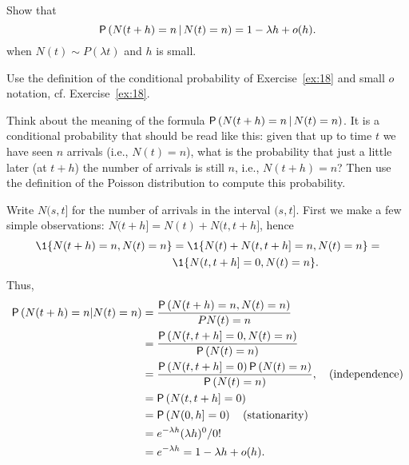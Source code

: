 \begin{exercise}{\faFlask}\label{ex:35}
  Show that 
  \begin{equation*}
\P{N(t+h) = n \given N(t) = n} = 1-\lambda h + o(h).
  \end{equation*}
when $N(t) \sim P(\lambda t)$  and $h$ is small. 
    \begin{hint}
Use  the definition of the conditional probability of Exercise~\ref{ex:18} and small $o$ notation, cf. Exercise~\ref{ex:18}. 

Think about the meaning of the formula $\P{N(t+h) = n \given N(t) = n}$.
It is a conditional probability that should be read like this: given that up to time $t$ we have seen $n$ arrivals (i.e., $N(t)=n$), what is the probability that just a little later (at $t+h$) the number of arrivals is still $n$, i.e., $N(t+h)=n$?
Then use the definition of the Poisson distribution to compute this probability.
    \end{hint}
\begin{solution}
Write $N(s, t]$ for the number of arrivals in the interval $(s,t]$. First we make a few simple observations: $N(t+h]= N(t) + N(t, t+h]$, hence
\begin{equation*}
  \begin{split}
  \1{N(t+h)=n, N(t)=n}
&=  \1{N(t) + N(t, t+h] = n, N(t)=n} = \\
&\1{N(t, t+h] = 0, N(t)=n}.
  \end{split}
\end{equation*}
Thus, 
    \begin{align*}
  \P{N(t+h) = n | N(t) = n} 
&=  \frac{\P{N(t+h) = n, N(t) = n}}{P{N(t)=n}} \\
&=  \frac{\P{N(t, t+h] = 0,  N(t) = n}}{\P{N(t)=n}} \\
&=  \frac{\P{N(t, t+h] = 0} \P{N(t) = n}}{\P{N(t)=n}}, \quad \text{(independence)}\\
&= \P{N(t, t+h] = 0} \\
&= \P{N(0, h] = 0} \quad\text{(stationarity)} \\
&= e^{-\lambda h} (\lambda h)^0/0! \\
&= e^{-\lambda h} = 1-\lambda h + o(h).
    \end{align*}
\end{solution}
\end{exercise}

